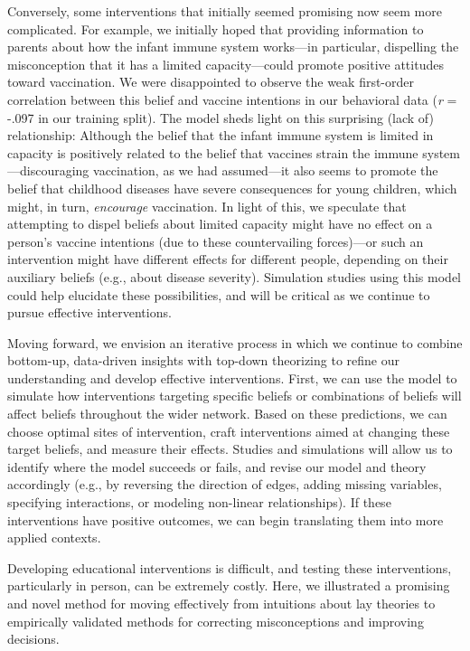 \documentclass[10pt, letterpaper]{article}
\begin{document}
Conversely, some interventions that initially seemed promising now seem
more complicated. For example, we initially hoped that providing
information to parents about how the infant immune system works---in
particular, dispelling the misconception that it has a limited
capacity---could promote positive attitudes toward vaccination. We were
disappointed to observe the weak first-order correlation between this
belief and vaccine intentions in our behavioral data (\emph{r} = -.097
in our training split). The model sheds light on this surprising (lack
of) relationship: Although the belief that the infant immune system is
limited in capacity is positively related to the belief that vaccines
strain the immune system---discouraging vaccination, as we had
assumed---it also seems to promote the belief that childhood diseases
have severe consequences for young children, which might, in turn,
\emph{encourage} vaccination. In light of this, we speculate that
attempting to dispel beliefs about limited capacity might have no effect
on a person's vaccine intentions (due to these countervailing
forces)---or such an intervention might have different effects for
different people, depending on their auxiliary beliefs (e.g., about
disease severity). Simulation studies using this model could help
elucidate these possibilities, and will be critical as we continue to
pursue effective interventions.

Moving forward, we envision an iterative process in which we continue to
combine bottom-up, data-driven insights with top-down theorizing to
refine our understanding and develop effective interventions. First, we
can use the model to simulate how interventions targeting specific
beliefs or combinations of beliefs will affect beliefs throughout the
wider network. Based on these predictions, we can choose optimal sites
of intervention, craft interventions aimed at changing these target
beliefs, and measure their effects. Studies and simulations will allow
us to identify where the model succeeds or fails, and revise our model
and theory accordingly (e.g., by reversing the direction of edges,
adding missing variables, specifying interactions, or modeling
non-linear relationships). If these interventions have positive
outcomes, we can begin translating them into more applied contexts.

Developing educational interventions is difficult, and testing these
interventions, particularly in person, can be extremely costly. Here, we
illustrated a promising and novel method for moving effectively from
intuitions about lay theories to empirically validated methods for
correcting misconceptions and improving decisions.
\end{document}
